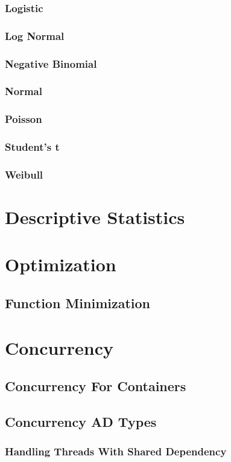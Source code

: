 \documentclass[12pt,a4paper]{article}
\begin{document}
\subsubsection{Logistic}
\subsubsection{Log Normal}
\subsubsection{Negative Binomial}
\subsubsection{Normal}
\subsubsection{Poisson}
\subsubsection{Student's t}
\subsubsection{Weibull}
\section{Descriptive Statistics}
\section{Optimization}
\subsection{Function Minimization}
\section{Concurrency}
\subsection{Concurrency For Containers}
\subsection{Concurrency AD Types}
\subsubsection{Handling Threads With Shared Dependency}
\end{document}
